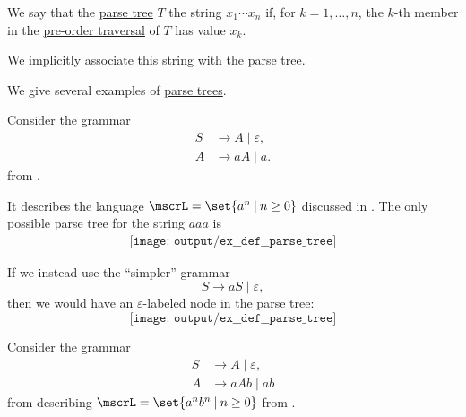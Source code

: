 \begin{definition}\label{def:parse_tree_string}
  We say that the \hyperref[def:parse_tree]{parse tree} \( T \)  the string \( x_1 \cdots x_n \) if, for \( k = 1, \ldots, n \), the \( k \)-th member in the \hyperref[def:traversal_ordering]{pre-order traversal} of \( T \) has value \( x_k \).
\end{definition}
\begin{comments}
  \item We implicitly associate this string with the parse tree.
\end{comments}

\begin{example}\label{ex:def:parse_tree}
  We give several examples of \hyperref[def:parse_tree]{parse trees}.

  \begin{thmenum}
     Consider the grammar
    \begin{equation*}
      \begin{aligned}
        S &\to A \mid \varepsilon, \\
        A &\to aA \mid a.
      \end{aligned}
    \end{equation*}
    from .

    It describes the language \( \mscrL = \set{ a^n \given n \geq 0 } \) discussed in . The only possible parse tree for the string \( aaa \) is
    \begin{equation*}\label{eq:ex:def:parse_tree/an}
      \begin{aligned}
        \texttt{[image: output/ex\_\_def\_\_parse\_tree]}
      \end{aligned}
    \end{equation*}

    If we instead use the \enquote{simpler} grammar
    \begin{equation*}
      S \to aS \mid \varepsilon,
    \end{equation*}
    then we would have an \( \varepsilon \)-labeled node in the parse tree:
    \begin{equation*}
      \texttt{[image: output/ex\_\_def\_\_parse\_tree]}
    \end{equation*}

     Consider the grammar
    \begin{equation*}
      \begin{aligned}
        S &\to A \mid \varepsilon, \\
        A &\to aAb \mid ab
      \end{aligned}
    \end{equation*}
    from  describing \( \mscrL = \set{ a^n b^n \given n \geq 0 } \) from .


\end{thmenum}
\end{example}
